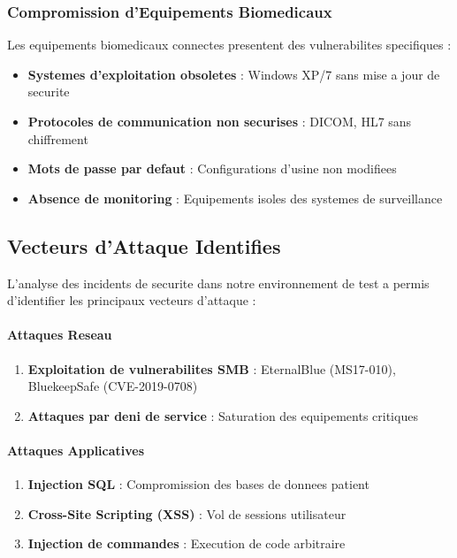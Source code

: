 \subsubsection{Compromission d'Equipements Biomedicaux}

Les equipements biomedicaux connectes presentent des vulnerabilites specifiques :

\begin{itemize}
    \item \textbf{Systemes d'exploitation obsoletes} : Windows XP/7 sans mise a jour de securite
    \item \textbf{Protocoles de communication non securises} : DICOM, HL7 sans chiffrement
    \item \textbf{Mots de passe par defaut} : Configurations d'usine non modifiees
    \item \textbf{Absence de monitoring} : Equipements isoles des systemes de surveillance
\end{itemize}
\clearpage

\subsection{Vecteurs d'Attaque Identifies}

L'analyse des incidents de securite dans notre environnement de test a permis d'identifier les principaux vecteurs d'attaque :

\paragraph{Attaques Reseau}
\begin{enumerate}
    \item \textbf{Exploitation de vulnerabilites SMB} : EternalBlue (MS17-010), BluekeepSafe (CVE-2019-0708)
    \item \textbf{Attaques par deni de service} : Saturation des equipements critiques
\end{enumerate}

\paragraph{Attaques Applicatives}
\begin{enumerate}
    \item \textbf{Injection SQL} : Compromission des bases de donnees patient
    \item \textbf{Cross-Site Scripting (XSS)} : Vol de sessions utilisateur
    \item \textbf{Injection de commandes} : Execution de code arbitraire
\end{enumerate}

